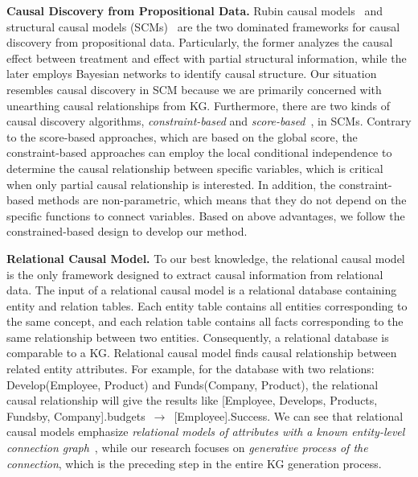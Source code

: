 \noindent
\textbf{Causal Discovery from Propositional Data.}
Rubin causal models~\cite{imbens2010rubin} and structural causal models (SCMs)~\cite{pearl2010causal} are the two dominated frameworks for causal discovery from propositional data. Particularly, the former analyzes the causal effect between treatment and effect with partial structural information, while the later employs Bayesian networks to identify causal structure.
Our situation resembles causal discovery in SCM because we are primarily concerned with unearthing causal relationships from KG.
Furthermore, there are two kinds of causal discovery algorithms, \textit{constraint-based} and \textit{score-based}~\cite{spirtes2000causation}, in SCMs.
Contrary to the score-based approaches, which are based on the global score, the constraint-based approaches can employ the local conditional independence to determine the causal relationship between specific variables, which is critical when only partial causal relationship is interested.
In addition, the constraint-based methods are non-parametric, which means that they do not depend on the specific functions to connect variables.
Based on above advantages, we follow the constrained-based design to develop our method.


\noindent
\textbf{Relational Causal Model.}
To our best knowledge, the relational causal model~\cite{maier2010learning,lee2016learning,lee2020towards,salimi2020causal} is the only framework designed to extract causal information from relational data.
The input of a relational causal model is a relational database containing entity and relation tables.
Each entity table contains all entities corresponding to the same concept, and each relation table contains all facts corresponding to the same relationship between two entities.
Consequently, a relational database is comparable to a KG.
Relational causal model finds causal relationship between related entity attributes.
For example, for the database with two relations: Develop(Employee, Product) and Funds(Company, Product), the relational causal relationship will give the results like [Employee, Develops, Products, Fundsby, Company].budgets $\,\to\,$  [Employee].Success.
We can see that
relational causal models emphasize \emph{relational models of attributes with a known entity-level connection graph}~\cite{maier2013sound}, while our research focuses on \emph{generative process of the connection}, which is the preceding step in the entire KG generation process.


